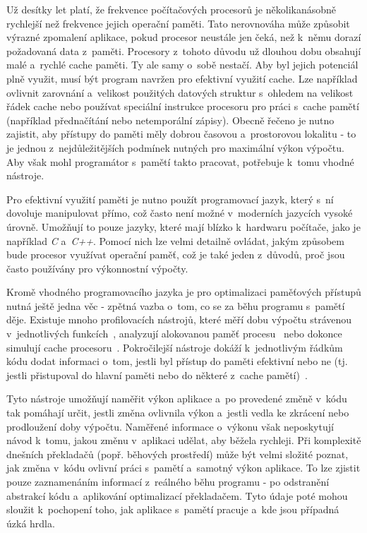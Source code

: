 Už desítky let platí, že frekvence počítačových procesorů je několikanásobně rychlejší než frekvence jejich operační paměti. Tato nerovnováha může způsobit výrazné zpomalení aplikace, pokud procesor neustále jen čeká, než k~němu dorazí požadovaná data z~paměti. Procesory z~tohoto důvodu už dlouhou dobu obsahují malé a~rychlé cache paměti. Ty ale samy o~sobě nestačí. Aby byl jejich potenciál plně využit, musí být program navržen pro efektivní využití cache. Lze například ovlivnit zarovnání a~velikost použitých datových struktur s~ohledem na velikost řádek cache nebo používat speciální instrukce procesoru pro práci s~cache pamětí (například přednačítání nebo netemporální zápisy). Obecně řečeno je nutno zajistit, aby přístupy do paměti měly dobrou časovou a~prostorovou lokalitu - to je jednou z~nejdůležitějších podmínek nutných pro maximální výkon výpočtu. Aby však mohl programátor s~pamětí takto pracovat, potřebuje k~tomu vhodné nástroje.

Pro efektivní využití paměti je nutno použít programovací jazyk, který s~ní dovoluje manipulovat přímo, což často není možné v~moderních jazycích vysoké úrovně. Umožňují to pouze jazyky, které mají blízko k~hardwaru počítače, jako je například \emph{C} a~\emph{C++}. Pomocí nich lze velmi detailně ovládat, jakým způsobem bude procesor využívat operační paměť, což je také jeden z~důvodů, proč jsou často používány pro výkonnostní výpočty.

Kromě vhodného programovacího jazyka je pro optimalizaci paměťových přístupů nutná ještě jedna věc - zpětná vazba o~tom, co se za běhu programu s~pamětí děje. Existuje mnoho profilovacích nástrojů, které měří dobu výpočtu strávenou v~jednotlivých funkcích~\cite{gprof}, analyzují alokovanou paměť procesu~\cite{massif} nebo dokonce simulují cache procesoru~\cite{nethercotephd}. Pokročilejší nástroje dokáží k~jednotlivým řádkům kódu dodat informaci o~tom, jestli byl přístup do paměti efektivní nebo ne (tj. jestli přistupoval do hlavní paměti nebo do některé z~cache pamětí)~\cite{vtune}.

Tyto nástroje umožňují naměřit výkon aplikace a~po provedené změně v~kódu tak pomáhají určit, jestli změna ovlivnila výkon a~jestli vedla ke zkrácení nebo prodloužení doby výpočtu. Naměřené informace o~výkonu však neposkytují návod k~tomu, jakou změnu v~aplikaci udělat, aby běžela rychleji. Při komplexitě dnešních překladačů (popř. běhových prostředí) může být velmi složité poznat, jak změna v~kódu ovlivní práci s~pamětí a~samotný výkon aplikace. To lze zjistit pouze zaznamenáním informací z~reálného běhu programu - po odstranění abstrakcí kódu a~aplikování optimalizací překladačem. Tyto údaje poté mohou sloužit k~pochopení toho, jak aplikace s~pamětí pracuje a~kde jsou případná úzká hrdla.

